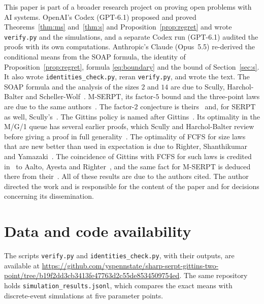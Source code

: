 \documentclass[11pt]{amsart}
\theoremstyle{remark}
\numberwithin{equation}{section}
\begin{document}
This paper is part of a broader research project on proving open problems with AI systems. OpenAI's Codex (GPT-6.1) proposed and proved Theorems~\ref{thm:ms} and~\ref{thm:s} and Proposition~\ref{prop:regret} and wrote \texttt{verify.py} and the simulations, and a separate Codex run (GPT-6.1) audited the proofs with its own computations. Anthropic's Claude (Opus~5.5) re-derived the conditional means from the SOAP formula, the identity of Proposition~\ref{prop:regret}, formula \eqref{eq:boundary} and the bound of Section~\ref{sec:s}. It also wrote \texttt{identities\_check.py}, reran \texttt{verify.py}, and wrote the text. The SOAP formula and the analysis of the sizes $2$ and $14$ are due to Scully, Harchol-Balter and Scheller-Wolf~\cite{SHS18}. M-SERPT, its factor-$5$ bound and the three-point laws are due to the same authors~\cite{SHS20}. The factor-$2$ conjecture is theirs~\cite{SHS20} and, for SERPT as well, Scully's~\cite{Scu22}. The Gittins policy is named after Gittins~\cite{Git89}. Its optimality in the M/G/1 queue has several earlier proofs, which Scully and Harchol-Balter review before giving a proof in full generality~\cite[Theorem~V.1 and Section~II]{SH21}. The optimality of FCFS for size laws that are new better than used in expectation is due to Righter, Shanthikumar and Yamazaki~\cite{RSY90}. The coincidence of Gittins with FCFS for such laws is credited in~\cite{SHS20} to Aalto, Ayesta and Righter~\cite{AAR09}, and the same fact for M-SERPT is deduced there from their~\cite[Proposition~9]{AAR11}. All of these results are due to the authors cited. The author directed the work and is responsible for the content of the paper and for decisions concerning its dissemination.

\section*{Data and code availability}

The scripts \texttt{verify.py} and \texttt{identities\_check.py}, with
their outputs, are available at
\url{https://github.com/yspennstate/sharp-serpt-gittins-two-point/tree/b19f2dd3cb3413fe47763d2c55de8534509754ed}. The
same repository holds \texttt{simulation\_results.jsonl}, which compares
the exact means with discrete-event simulations at five parameter points.
\end{document}
